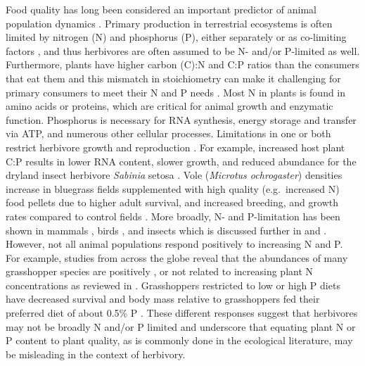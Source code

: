 \documentclass[
]{article}
\begin{document}
Food quality has long been considered an important predictor of animal
population dynamics
\citep{white_inadequate_1993, andersen_stoichiometry_2004}. Primary
production in terrestrial ecosystems is often limited by nitrogen (N)
and phosphorus (P), either separately or as co-limiting factors
\citep{tyrrell_relative_1999, vitousek_terrestrial_2010}, and thus
herbivores are often assumed to be N- and/or P-limited as well.
Furthermore, plants have higher carbon (C):N and C:P ratios than the
consumers that eat them and this mismatch in stoichiometry can make it
challenging for primary consumers to meet their N and P needs
\citep{elser_nutritional_2000}. Most N in plants is found in amino acids
or proteins, which are critical for animal growth and enzymatic
function. Phosphorus is necessary for RNA synthesis, energy storage and
transfer via ATP, and numerous other cellular processes. Limitations in
one or both restrict herbivore growth and reproduction
\citep{sterner2003}. For example, increased host plant C:P results in
lower RNA content, slower growth, and reduced abundance for the dryland
insect herbivore \emph{Sabinia} setosa
\citep{schade_stoichiometric_2003}. Vole (\emph{Microtus ochrogaster})
densities increase in bluegrass fields supplemented with high quality
(e.g.~increased N) food pellets due to higher adult survival, and
increased breeding, and growth rates compared to control fields
\citep{cole_influence_1978}. More broadly, N- and P-limitation has been
shown in mammals
\citep{white_inadequate_1993, randolph_nutritional_1995}, birds
\citep{forero_conspecific_2002, granbom_food_2006}, and insects
\citep{floyd_frontiers_1996, huberty_consequences_2006, marsh_decline_1995, perkins_dietary_2004}
which is discussed further in \citet{white_role_2008} and
\citet{andersen_stoichiometry_2004}. However, not all animal populations
respond positively to increasing N and P. For example, studies from
across the globe reveal that the abundances of many grasshopper species
are positively
\citep{joern_not_2012, zhu_negative_2019, welti_nutrient_2020, welti_bottomup_2020, zhu_effects_2020, ozment_tracking_2021},
or not related
\citep{heidorn_feeding_1987, jonas_hostplant_2008, lenhart_water_2015, ozment_tracking_2021}
to increasing plant N concentrations as reviewed in
\citet{cease_how_2024}. Grasshoppers restricted to low or high P diets
have decreased survival and body mass relative to grasshoppers fed their
preferred diet of about 0.5\% P \citet{cease_dietary_2016}. These
different responses suggest that herbivores may not be broadly N and/or
P limited and underscore that equating plant N or P content to plant
quality, as is commonly done in the ecological literature, may be
misleading in the context of herbivory.
\end{document}

